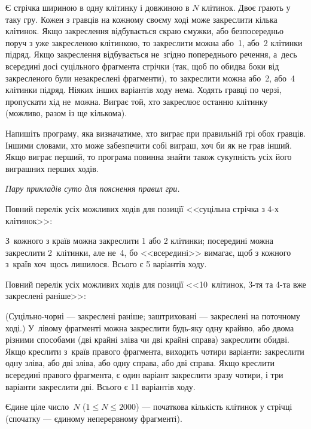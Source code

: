 ﻿Є стрічка шириною в одну клітинку і довжиною в $N$ клітинок.
Двоє грають у таку гру.
Кожен з гравців на кожному своєму ході може закреслити кілька клітинок. 
Якщо закреслення відбувається скраю смужки, або безпосередньо поруч з уже закресленою клітинкою,
то закреслити можна або~1, або~2 клітинки підряд.
Якщо закреслення відбувається не~згідно попереднього речення, а~десь всер{\it е}дині досі суцільного фрагмента стрічки (так, щоб по обидва боки від закресленого були незакреслені фрагменти), то закреслити можна або~2, або~4 клітинки підряд.
Ніяких інших варіантів ходу нема. 
Ходять гравці по черзі, пропускати хід не~можна.
Виграє той, хто закреслює останню клітинку (можливо, разом із ще кількома).

Напишіть програму, яка визначатиме, хто виграє при правильній грі обох гравців. 
Іншими словами, хто може забезпечити собі виграш, хоч би як не грав інший.
Якщо виграє перший, то програма повинна знайти також сукупність усіх його виграшних перших ходів.


{\it Пару прикладів суто для пояснення правил гри.}

Повний перелік усіх можливих ходів для позиції <<суцільна стрічка з 4-х клітинок>>:


З~кожного з країв можна закреслити 1 або 2 клітинки; 
посередині можна закреслити 2~клітинки, 
але не~4, бо <<всер{\it е}дині>> вимагає, щоб з кожного з~країв хоч~щось лишилося.
Всього є 5 варіантів ходу.


Повний перелік усіх можливих ходів для позиції <<10~клітинок, 3-тя та 4-та вже закреслені раніше>>:


(Суцільно-чорні --- закреслені раніше; заштриховані --- закреслені на поточному ході.)
У~лівому фрагменті можна закреслити будь-яку одну крайню, або двома різними способами (дві крайні зліва чи дві крайні справа) закреслити обидві.
Якщо креслити з~країв правого фрагмента, виходить чотири варіанти: закреслити 
одну зліва, або
дві зліва, або
одну справа, або
дві справа.
Якщо креслити всер{\it е}дині правого фрагмента, є один варіант закреслити зразу чотири,
і три варіанти закреслити дві.
Всього є 11 варіантів ходу.


\InputFile

Єдине ціле число~$N$ ($1\leqslant N\leqslant 2000$) --- початкова кількість клітинок у стрічці (спочатку --- єдиному неперервному фрагменті).


